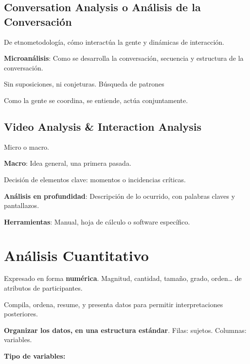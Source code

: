 \documentclass[12pt, twoside, openright]{report} %
\begin{document}
\subsection{Conversation Analysis o Análisis de la
Conversación}

De etnometodología, cómo interactúa la gente y dinámicas de interacción.

\textbf{Microanálisis}: Como se desarrolla la conversación, secuencia y
estructura de la conversación.

Sin suposiciones, ni conjeturas. Búsqueda de patrones

Como la gente se coordina, se entiende, actúa conjuntamente.

\subsection{Video Analysis \& Interaction
Analysis}

Micro o macro.

\textbf{Macro}: Idea general, una primera pasada.

Decisión de elementos clave: momentos o incidencias críticas.

\textbf{Análisis en profundidad}: Descripción de lo ocurrido, con
palabras claves y pantallazos.

\textbf{Herramientas}: Manual, hoja de cálculo o software específico.

\section{Análisis Cuantitativo}

Expresado en forma \textbf{numérica}. Magnitud, cantidad, tamaño, grado,
orden\ldots{} de atributos de participantes.

Compila, ordena, resume, y presenta datos para permitir interpretaciones
posteriores.

\textbf{Organizar los datos, en una estructura estándar}. Filas: sujetos. Columnas: variables.

\textbf{Tipo de variables:}
\end{document}
